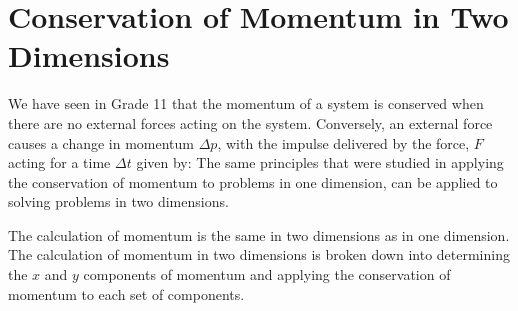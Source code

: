 \section{Conservation of Momentum in Two Dimensions}

We have seen in Grade 11 that the momentum of a system is conserved when there are no external forces acting on the system. Conversely, an external force causes a change in momentum $\Delta p$, with the impulse delivered by the force, $F$ acting for a time $\Delta t$ given by:
The same principles that were studied in applying the conservation of momentum to problems in one dimension, can be applied to solving problems in two dimensions. 

The calculation of momentum is the same in two dimensions as in one dimension. The calculation of momentum in two dimensions is broken down into determining the $x$ and $y$ components of momentum and applying the conservation of momentum to each set of components. 

